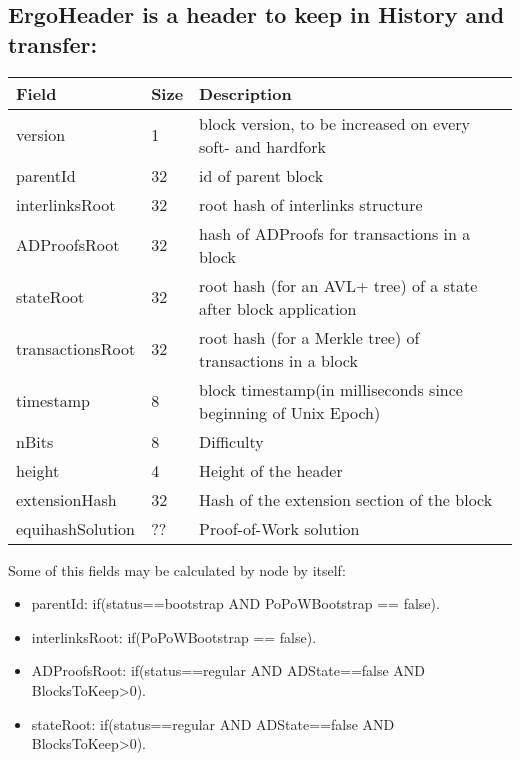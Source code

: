 \documentclass[]{article}   %
\begin{document}
\subsection{ErgoHeader is a header to keep in History and transfer:}
\vspace{1em}
\begin{tabular}{ |p{2.5cm}||p{0.5cm}|p{7.5cm}|  }
 \hline
 \hline
 Field & Size & Description  \\
 \hline
 version  &  1 &  block version, to be increased on every soft- and hardfork  \\
 \hline
 parentId &  32 &  id of parent block  \\
 \hline
 interlinksRoot &  32 &  root hash of interlinks structure  \\
 \hline
 ADProofsRoot &  32 &  hash of ADProofs for transactions in a block \\
 \hline
 stateRoot &  32 &  root hash (for an AVL+ tree) of a state after block application  \\
 \hline
 transactionsRoot  &  32 &  root hash (for a Merkle tree) of transactions in a block  \\
 \hline
 timestamp &  8 &  block timestamp(in milliseconds since beginning of Unix Epoch)  \\
 \hline

 nBits     &  8 &  Difficulty  \\
 \hline

 height    &  4 &  Height of the header  \\
 \hline

 extensionHash &  32 &  Hash of the extension section of the block  \\
 \hline

 equihashSolution     &  ?? &  Proof-of-Work solution   \\
 \hline
\end{tabular}

\vspace{1em}
Some of this fields may be calculated by node by itself: 

  
   \begin{itemize}
     \item parentId: if(status==bootstrap AND PoPoWBootstrap == false).
     \item interlinksRoot: if(PoPoWBootstrap == false).
     \item ADProofsRoot: if(status==regular AND ADState==false AND BlocksToKeep>0).
     \item stateRoot: if(status==regular AND ADState==false AND BlocksToKeep>0).
     \end{itemize}
     
\end{document}

